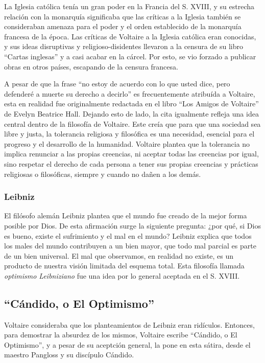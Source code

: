 \documentclass{article}
\begin{document}
La Iglesia católica tenía un gran poder en la Francia del S. XVIII, y su estrecha relación con la monarquía significaba que las críticas a la Iglesia también se consideraban amenaza para el poder y el orden establecido de la monarquía francesa de la época. Las críticas de Voltaire a la Iglesia católica eran conocidas, y sus ideas disruptivas y religioso-disidentes llevaron a la censura de su libro “Cartas inglesas” y a casi acabar en la cárcel. Por esto, se vio forzado a publicar obras en otros países, escapando de la censura francesa.

A pesar de que la frase ``no estoy de acuerdo con lo que usted dice, pero defenderé a muerte su derecho a decirlo'' es frecuentemente atribuída a Voltaire, esta en realidad fue originalmente redactada en el libro ``Los Amigos de Voltaire'' de Evelyn Beatrice Hall. Dejando esto de lado, la cita igualmente refleja una idea central dentro de la filosofía de Voltaire. Este creía que para que una sociedad sea libre y justa, la tolerancia religiosa y filosófica es una necesidad, esencial para el progreso y el desarrollo de la humanidad. Voltaire plantea que la tolerancia no implica renunciar a las propias creencias, ni aceptar todas las creencias por igual, sino respetar el derecho de cada persona a tener sus propias creencias y prácticas religiosas o filosóficas, siempre y cuando no dañen a los demás.

\subsubsection*{Leibniz}

El filósofo alemán Leibniz plantea que el mundo fue creado de la mejor forma posible por Dios. De esta afirmación surge la siguiente pregunta: ¿por qué, si Dios es bueno, existe el sufrimiento y el mal en el mundo? Leibniz explica que todos los males del mundo contribuyen a un bien mayor, que todo mal parcial es parte de un bien universal. El mal que observamos, en realidad no existe, es un producto de nuestra visión limitada del esquema total. Esta filosofía llamada \textit{optimismo Leibniziano} fue una idea por lo general aceptada en el S. XVIII.

\subsection{``Cándido, o El Optimismo''}

Voltaire consideraba que los planteamientos de Leibniz eran ridículos. Entonces, para demostrar la absurdez de los mismos, Voltaire escribe ``Cándido, o El Optimismo'', y a pesar de su aceptción general, la pone en esta sátira, desde el maestro Pangloss y su discípulo Cándido.
\end{document}
